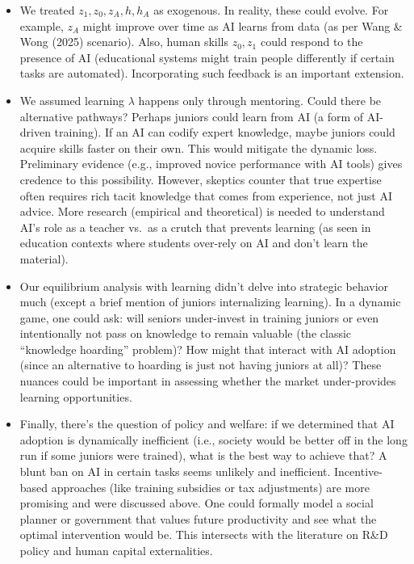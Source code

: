 \documentclass[12pt]{article}
\begin{document}
\begin{itemize}
\tightlist
\item
  We treated \(z_1, z_0, z_A, h, h_A\) as exogenous. In reality, these
  could evolve. For example, \(z_A\) might improve over time as AI
  learns from data (as per Wang \& Wong (2025) scenario). Also, human
  skills \(z_0, z_1\) could respond to the presence of AI (educational
  systems might train people differently if certain tasks are
  automated). Incorporating such feedback is an important extension.
\item
  We assumed learning \(\lambda\) happens only through mentoring. Could
  there be alternative pathways? Perhaps juniors could learn from AI (a
  form of AI-driven training). If an AI can codify expert knowledge,
  maybe juniors could acquire skills faster on their own. This would
  mitigate the dynamic loss. Preliminary evidence (e.g., improved novice
  performance with AI tools) gives credence to this possibility.
  However, skeptics counter that true expertise often requires rich
  tacit knowledge that comes from experience, not just AI advice. More
  research (empirical and theoretical) is needed to understand AI's role
  as a teacher vs.~as a crutch that {prevents} learning (as seen in
  education contexts where students over-rely on AI and don't learn the
  material).
\item
  Our equilibrium analysis with learning didn't delve into strategic
  behavior much (except a brief mention of juniors internalizing
  learning). In a dynamic game, one could ask: will seniors
  {under-invest in training} juniors or even intentionally not pass
  on knowledge to remain valuable (the classic ``knowledge hoarding''
  problem)? How might that interact with AI adoption (since an
  alternative to hoarding is just not having juniors at all)? These
  nuances could be important in assessing whether the market
  under-provides learning opportunities.
\item
  Finally, there's the question of {policy and welfare}: if we
  determined that AI adoption is dynamically inefficient (i.e., society
  would be better off in the long run if some juniors were trained),
  what is the best way to achieve that? A blunt ban on AI in certain
  tasks seems unlikely and inefficient. Incentive-based approaches (like
  training subsidies or tax adjustments) are more promising and were
  discussed above. One could formally model a social planner or
  government that values future productivity and see what the optimal
  intervention would be. This intersects with the literature on R\&D
  policy and human capital externalities.
\end{itemize}
\end{document}
